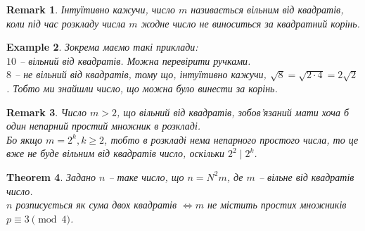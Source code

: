 \documentclass[a4paper, 14pt]{extarticle}
\theoremstyle{theoremdd}
\newtheorem{theorem}{Theorem}[subsection]
\theoremstyle{theoremdd}
\theoremstyle{theoremdd}
\theoremstyle{theoremdd}
\newtheorem{example}[theorem]{Example}
\theoremstyle{theoremdd}
\theoremstyle{theoremdd}
\newtheorem{remark}[theorem]{Remark}
\theoremstyle{theoremdd}
\theoremstyle{theoremdd}
\begin{document}
\begin{remark}
Інтуїтивно кажучи, число $m$ називається вільним від квадратів, коли під час розкладу числа $m$ жодне число не виноситься за квадратний корінь.
\end{remark}

\begin{example}
Зокрема маємо такі приклади:\\
$10$ -- вільний від квадратів. Можна перевірити ручками.\\
$8$ -- не вільний від квадратів, тому що, інтуїтивно кажучи, $\sqrt{8} = \sqrt{2 \cdot 4} = 2 \sqrt{2}$. Тобто ми знайшли число, що можна було винести за корінь.
\end{example}

\begin{remark}
Число $m>2$, що вільний від квадратів, зобов'язаний мати хоча б один непарний простий множник в розкладі.\\
Бо якщо $m = 2^k, k \geq 2$, тобто в розкладі нема непарного простого числа, то це вже не буде вільним від квадратів число, оскільки $2^2 \mid 2^k$.
\end{remark}

\begin{theorem}
Задано $n$ -- таке число, що $n = N^2m$, де $m$ -- вільне від квадратів число.\\
$n$ розписується як сума двох квадратів $\iff m$ не містить простих множників $p \equiv 3 \pmod 4$.
\end{theorem}
\end{document}
